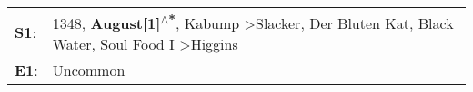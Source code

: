 \begin{supertabular}{p{0.03\textwidth}p{0.92\textwidth}}
 \textbf{S1}:  &  1348\textsuperscript{}, \enspace \textbf{August[1]\textsuperscript{$\wedge$*}}, \enspace Kabump\textsuperscript{} \textgreater \enspace Slacker\textsuperscript{}, \enspace Der Bluten Kat\textsuperscript{}, \enspace Black Water\textsuperscript{}, \enspace Soul Food I\textsuperscript{} \textgreater \enspace Higgins\textsuperscript{}  \enspace  \\
 \textbf{E1}:  &                                                                                                                                                                                                                                                                                                                    Uncommon\textsuperscript{}  \enspace  \\
\end{supertabular}
